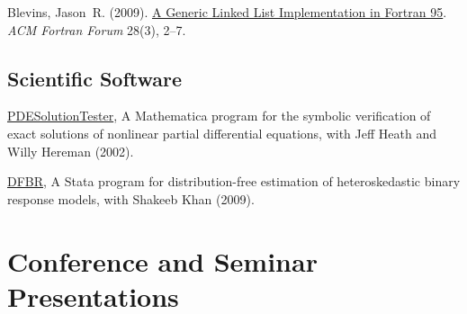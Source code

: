 \documentclass[10pt,letterpaper]{article}
\renewenvironment{itemize}{
  \begin{list}{}{
    \setlength{\leftmargin}{1.5em}
    \setlength{\itemsep}{0.25em}
    \setlength{\parskip}{0pt}
    \setlength{\parsep}{0.25em}
  }
}{
  \end{list}
}
\begin{document}
\begin{itemize}

\item Blevins, Jason~R. (2009).
  \href{http://jblevins.org/research/generic-list}{A Generic Linked List Implementation in Fortran 95}.
  \textit{ACM Fortran Forum} 28(3), 2--7.

\end{itemize}

\subsection*{Scientific Software}

\begin{itemize}

\item \href{http://jblevins.org/research/pdest}{PDESolutionTester},
  A Mathematica program for the symbolic verification of exact solutions
  of nonlinear partial differential equations,
  with Jeff Heath and Willy Hereman (2002).

\item \href{http://jblevins.org/research/dfbr}{DFBR},
  A Stata program for distribution-free estimation of heteroskedastic
  binary response models,
  with Shakeeb Khan (2009).

\end{itemize}

\section*{Conference and Seminar Presentations}
\end{document}

